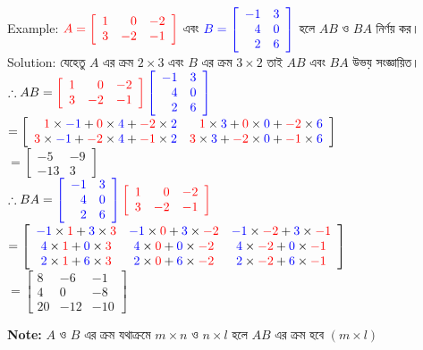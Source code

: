 \newpage
Example: 
$\color{red} A=\left[\begin{array}{rrr}
1 & 0 & -2 \\
3 & -2 & -1
\end{array}\right]$ এবং 
$\color{blue} B=\left[\begin{array}{rr}
-1 & 3 \\
4 & 0 \\
2 & 6
\end{array}\right]$ হলে $AB$ ও $BA$ নির্ণয় কর।\\
Solution: যেহেতু $A$ এর ক্রম $2\times 3$ এবং $B$ এর ক্রম $3\times 2$ তাই $AB$ এবং $BA$ উভয় সংজ্ঞায়িত। \\  
$\therefore AB=\color{red}\left[\begin{array}{rrr}
1 & 0 & -2 \\
3 & -2 & -1
\end{array}\right]\color{blue}\left[\begin{array}{rr}
-1 & 3 \\
4 & 0 \\
2 & 6
\end{array}\right]$\\
$ \def \rb#1x#2{\textcolor{red}{#1}\times\textcolor{blue}{#2}}
=\left[\begin{array}{rrr}
\rb1x{-1} + \rb0x4 + \rb-2x2 & \rb1x3 + \rb0x0 + \rb-2x6 \\
\rb3x{-1} + \rb-2x4 + \rb-1x2 & \rb3x3 + \rb-2x0 + \rb-1x6 \\
\end{array}\right]$\\
$=\left[\begin{array}{rr}
-5 & -9 \\
-13 & 3
\end{array}\right]$\\
$\therefore BA=\color{blue}\left[\begin{array}{rr}
-1 & 3 \\
4 & 0 \\
2 & 6
\end{array}\right]\color{red}\left[\begin{array}{rrr}
1 & 0 & -2 \\
3 & -2 & -1
\end{array}\right]$\\
$ \def \br#1x#2{\textcolor{blue}{#1}\times\textcolor{red}{#2}}
=\left[\begin{array}{ccc}
\br-1x1+\br3x3 & \br-1x0+\br3x{-2} & \br-1x{-2}+\br3x{-1} \\
\br4x1+\br0x3 & \br4x0+\br0x{-2} & \br4x{-2}+\br0x{-1} \\
\br2x1+\br6x3 & \br2x0+\br6x{-2} & \br2x{-2}+\br6x{-1} 
\end{array}\right]$\\
$=\left[\begin{array}{rrr}
8 & -6 & -1 \\
4 & 0 & -8 \\
20 & -12 & -10
\end{array}\right]$
\begin{tcolorbox}
	\textbf{Note:} $A$ ও $B$ এর ক্রম যথাক্রমে $m\times n$ ও $n\times l$ হলে $AB$ এর ক্রম হবে $(m\times l)$
\end{tcolorbox}
